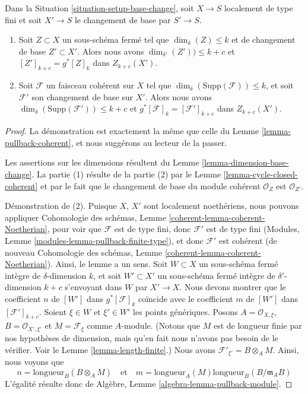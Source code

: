 \begin{lemma}
\label{lemma-pullback-coherent-base-change}
Dans la Situation \ref{situation-setup-base-change}, soit $X \to S$
localement de type fini et soit $X' \to S$ le changement de base par $S' \to S$.
\begin{enumerate}
\item Soit $Z \subset X$ un sous-schéma fermé tel que
$\dim_\delta(Z) \leq k$ et de changement de base $Z' \subset X'$. Alors nous avons
$\dim_{\delta'}(Z')) \leq k + c$
et $[Z']_{k + c} = g^*[Z]_k$ dans $Z_{k + c}(X')$.
\item Soit $\mathcal{F}$ un faisceau cohérent sur $X$ tel que
$\dim_\delta(\text{Supp}(\mathcal{F})) \leq k$, et soit
$\mathcal{F}'$ son changement de base sur $X'$.
Alors nous avons $\dim_\delta(\text{Supp}(\mathcal{F}')) \leq k + c$
et $g^*[\mathcal{F}]_k = [\mathcal{F}']_{k + c}$
dans $Z_{k + c}(X')$.
\end{enumerate}
\end{lemma}

\begin{proof}
La démonstration est exactement la même que celle du
Lemme \ref{lemma-pullback-coherent},
et nous suggérons au lecteur de la passer.

\medskip\noindent
Les assertions sur les dimensions résultent du
Lemme \ref{lemma-dimension-base-change}.
La partie (1) résulte de la partie (2) par le Lemme \ref{lemma-cycle-closed-coherent}
et par le fait que le changement de base du module cohérent $\mathcal{O}_Z$
est $\mathcal{O}_{Z'}$.

\medskip\noindent
Démonstration de (2). Puisque $X$, $X'$ sont localement noethériens, nous pouvons appliquer
Cohomologie des schémas, Lemme \ref{coherent-lemma-coherent-Noetherian}, pour voir
que $\mathcal{F}$ est de type fini, donc $\mathcal{F}'$ est
de type fini (Modules, Lemme \ref{modules-lemma-pullback-finite-type}),
et donc $\mathcal{F}'$ est cohérent
(de nouveau Cohomologie des schémas, Lemme \ref{coherent-lemma-coherent-Noetherian}).
Ainsi, le lemme a un sens. Soit $W \subset X$ un sous-schéma fermé intègre
de $\delta$-dimension $k$, et soit $W' \subset X'$ un sous-schéma
fermé intègre de $\delta'$-dimension $k + c$ s'envoyant dans $W$
par $X' \to X$. Nous devons montrer que le coefficient $n$ de
$[W']$ dans $g^*[\mathcal{F}]_k$ coïncide avec le coefficient
$m$ de $[W']$ dans $[\mathcal{F}']_{k + c}$. Soient $\xi \in W$ et
$\xi' \in W'$ les points génériques. Posons
$A = \mathcal{O}_{X, \xi}$, $B = \mathcal{O}_{X', \xi'}$
et $M = \mathcal{F}_\xi$ comme $A$-module. (Notons que
$M$ est de longueur finie par nos hypothèses de dimension, mais qu'en fait nous
n'avons pas besoin de le vérifier. Voir le
Lemme \ref{lemma-length-finite}.)
Nous avons $\mathcal{F}'_{\xi'} = B \otimes_A M$.
Ainsi, nous voyons que
$$
n = \text{longueur}_B(B \otimes_A M)
\quad
\text{et}
\quad
m = \text{longueur}_A(M) \text{longueur}_B(B/\mathfrak m_AB)
$$
L'égalité résulte donc de
Algèbre, Lemme \ref{algebra-lemma-pullback-module}.
\end{proof}

